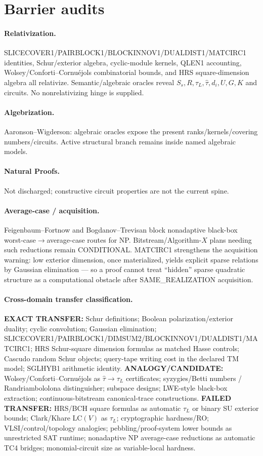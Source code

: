 \documentclass[11pt]{article}
\begin{document}
\section*{Barrier audits}
\paragraph{Relativization.}
SLICECOVER1/PAIRBLOCK1/BLOCKINNOV1/DUALDIST1/MATCIRC1 identities, Schur/exterior algebra,
cyclic-module kernels, QLEN1 accounting, Wolsey/Conforti--Cornu\'ejols combinatorial bounds,
and HRS square-dimension algebra all relativize. Semantic/algebraic oracles reveal
$S_s,R,\tau_L,\widehat\tau,d_i,U,G,K$ and circuits. No nonrelativizing hinge is supplied.
\paragraph{Algebrization.}
Aaronson--Wigderson: algebraic oracles expose the present ranks/kernels/covering numbers/circuits.
Active structural branch remains inside named algebraic models.
\paragraph{Natural Proofs.}
Not discharged; constructive circuit properties are not the current spine.
\paragraph{Average-case / acquisition.}
Feigenbaum--Fortnow and Bogdanov--Trevisan block nonadaptive black-box worst-case$\to$average-case
routes for NP. Bitstream/Algorithm-$X$ plans needing such reductions remain CONDITIONAL.
MATCIRC1 strengthens the acquisition warning: low exterior dimension, once materialized, yields
explicit sparse relations by Gaussian elimination --- so a proof cannot treat ``hidden'' sparse
quadratic structure as a computational obstacle after SAME\_REALIZATION acquisition.
\paragraph{Cross-domain transfer classification.}
\textbf{EXACT TRANSFER:} Schur definitions; Boolean polarization/exterior duality; cyclic convolution;
Gaussian elimination; SLICECOVER1/PAIRBLOCK1/DIMSUM2/BLOCKINNOV1/DUALDIST1/MATCIRC1;
HRS Schur-square dimension formulas as matched Hasse controls; Cascudo random Schur objects;
query-tape writing cost in the declared TM model; SGLHYB1 arithmetic identity.
\textbf{ANALOGY/CANDIDATE:} Wolsey/Conforti--Cornu\'ejols as $\widehat\tau\to\tau_L$ certificates;
syzygies/Betti numbers / Randriambololona distinguisher; subspace designs; LWE-style black-box
extraction; continuous-bitstream canonical-trace constructions.
\textbf{FAILED TRANSFER:} HRS/BCH square formulas as automatic $\tau_L$ or binary SU exterior bounds;
Clark/Khare $\mathrm{LC}(V)$ as $\tau_L$; cryptographic hardness/RO; VLSI/control/topology analogies;
pebbling/proof-system lower bounds as unrestricted SAT runtime; nonadaptive NP average-case
reductions as automatic TC4 bridges; monomial-circuit size as variable-local hardness.
\end{document}
